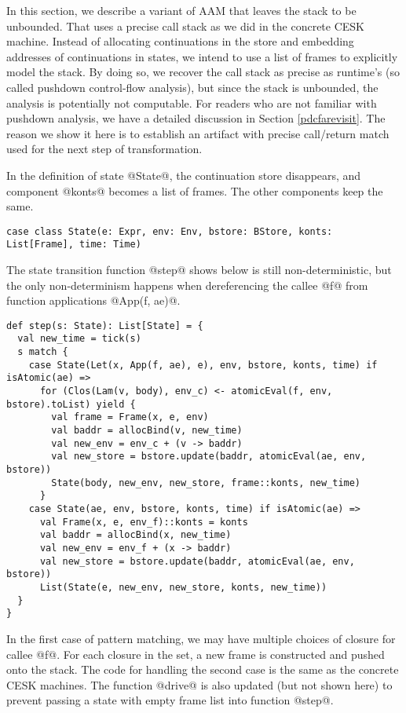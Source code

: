 \documentclass[acmsmall,review,anonymous]{acmart}\settopmatter{printfolios=true,printccs=false,printacmref=false}
\begin{document}
In this section, we describe a variant of AAM that leaves the stack to be 
unbounded. That uses a precise call stack as we did in the concrete CESK machine. 
Instead of allocating continuations in the store and embedding
addresses of continuations in states, we intend to use a list of frames
to explicitly model the stack.
By doing so, we recover the call stack as precise as runtime's
(so called pushdown control-flow analysis), but since 
the stack is unbounded, the analysis is potentially not computable.
For readers who are not familiar with pushdown analysis, we have a detailed 
discussion in Section \ref{pdcfarevisit}.
The reason we show it here is to establish an artifact with precise call/return match
used for the next step of transformation.

In the definition of state @State@, the continuation store disappears, and
component @konts@ becomes a list of frames. The other components keep the same.

\begin{lstlisting}
case class State(e: Expr, env: Env, bstore: BStore, konts: List[Frame], time: Time)
\end{lstlisting}

The state transition function @step@ shows below is still 
non-deterministic, but the only non-determinism happens when dereferencing the callee @f@ 
from function applications @App(f, ae)@. 

\begin{lstlisting}
def step(s: State): List[State] = {
  val new_time = tick(s)
  s match {
    case State(Let(x, App(f, ae), e), env, bstore, konts, time) if isAtomic(ae) =>
      for (Clos(Lam(v, body), env_c) <- atomicEval(f, env, bstore).toList) yield {
        val frame = Frame(x, e, env)
        val baddr = allocBind(v, new_time)
        val new_env = env_c + (v -> baddr)
        val new_store = bstore.update(baddr, atomicEval(ae, env, bstore))
        State(body, new_env, new_store, frame::konts, new_time)
      }
    case State(ae, env, bstore, konts, time) if isAtomic(ae) =>
      val Frame(x, e, env_f)::konts = konts
      val baddr = allocBind(x, new_time)
      val new_env = env_f + (x -> baddr)
      val new_store = bstore.update(baddr, atomicEval(ae, env, bstore))
      List(State(e, new_env, new_store, konts, new_time))
  }
}
\end{lstlisting}

In the first case of pattern matching, we may have multiple choices of closure for callee @f@.
For each closure in the set, a new frame is constructed and pushed onto the stack.
The code for handling the second case is the same as the concrete CESK machines.
The function @drive@ is also updated (but not shown here) to prevent passing a state with
empty frame list into function @step@.
\end{document}
